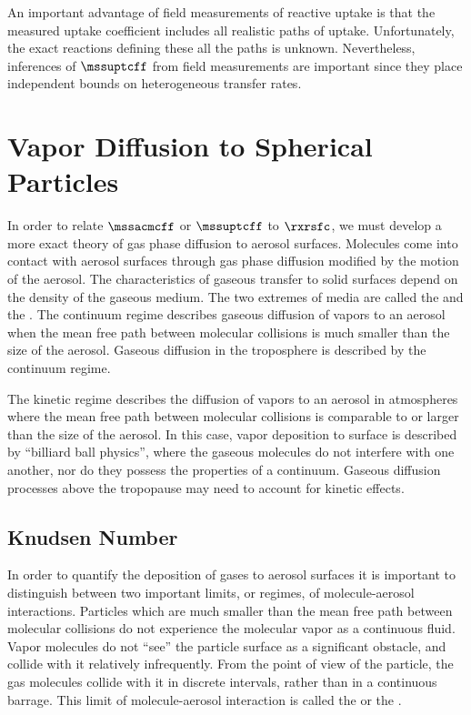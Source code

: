 \documentclass[12pt,twoside]{book}
\newcounter{reaction} %
\begin{document}
An important advantage of field measurements of reactive uptake is
that the measured uptake coefficient includes all realistic paths of
uptake.
Unfortunately, the exact reactions defining these all the paths is
unknown. 
Nevertheless, inferences of $\mssuptcff$ from field measurements are
important since they place independent bounds on heterogeneous
transfer rates.

\section[Vapor Diffusion to Spherical Particles]{Vapor Diffusion to Spherical Particles}\label{sxn:dff_vpr_sfc}
In order to relate $\mssacmcff$ or $\mssuptcff$ to $\rxrsfc$, we must
develop a more exact theory of gas phase diffusion to aerosol
surfaces. 
Molecules come into contact with aerosol surfaces through gas phase
diffusion modified by the motion of the aerosol.
The characteristics of gaseous transfer to solid surfaces depend on
the density of the gaseous medium.
The two extremes of media are called the  and
the .
The continuum regime describes gaseous diffusion of vapors to an
aerosol when the mean free path between molecular collisions is 
much smaller than the size of the aerosol.
Gaseous diffusion in the troposphere is described by the continuum
regime. 

The kinetic regime describes the diffusion of vapors to an aerosol
in atmospheres where the mean free path between molecular collisions
is comparable to or larger than the size of the aerosol. 
In this case, vapor deposition to surface is described by ``billiard
ball physics'', where the gaseous molecules do not interfere with one
another, nor do they possess the properties of a continuum. 
Gaseous diffusion processes above the tropopause may need to account
for kinetic effects. 

\subsection[Knudsen Number]{Knudsen Number}\label{sxn:knd_nbr}
In order to quantify the deposition of gases to aerosol surfaces it is
important to distinguish between two important limits, or regimes, of
molecule-aerosol interactions.
Particles which are much smaller than the mean free path between
molecular collisions do not experience the molecular vapor as a
continuous fluid. 
Vapor molecules do not ``see'' the particle surface as a significant
obstacle, and collide with it relatively infrequently. 
From the point of view of the particle, the gas molecules collide with
it in discrete intervals, rather than in a continuous barrage.
This limit of molecule-aerosol interaction is called the
 or the .
\end{document}
